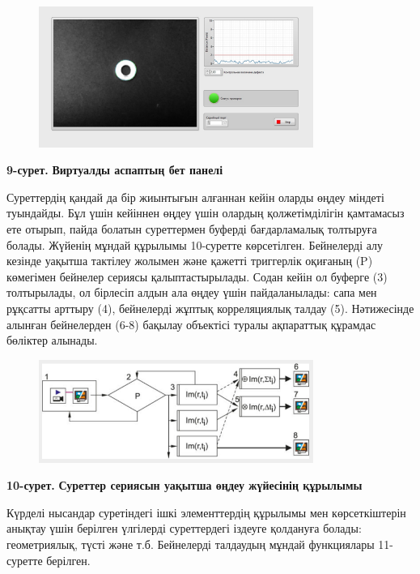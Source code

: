 \begin{figure}[H]
	\centering
	\includegraphics[width=0.8\textwidth]{media/ict2/image177}
	\caption*{}
\end{figure}


{\bfseries 9-сурет.} {\bfseries Виртуалды аспаптың бет панелі}

Суреттердің қандай да бір жиынтығын алғаннан кейін оларды өңдеу міндеті
туындайды. Бұл үшін кейіннен өңдеу үшін олардың қолжетімділігін
қамтамасыз ете отырып, пайда болатын суреттермен буферді бағдарламалық
толтыруға болады. Жүйенің мұндай құрылымы 10-суретте көрсетілген.
Бейнелерді алу кезінде уақытша тактілеу жолымен және қажетті триггерлік
оқиғаның (P) көмегімен бейнелер сериясы қалыптастырылады. Содан кейін ол
буферге (3) толтырылады, ол бірлесіп алдын ала өңдеу үшін пайдаланылады:
сапа мен рұқсатты арттыру (4), бейнелерді жұптық корреляциялық талдау
(5). Нәтижесінде алынған бейнелерден (6-8) бақылау объектісі туралы
ақпараттық құрамдас бөліктер алынады.


\begin{figure}[H]
	\centering
	\includegraphics[width=0.8\textwidth]{media/ict2/image178}
	\caption*{}
\end{figure}


{\bfseries 10-сурет.} {\bfseries Суреттер сериясын уақытша өңдеу жүйесінің
құрылымы}

Күрделі нысандар суретіндегі ішкі элементтердің құрылымы мен
көрсеткіштерін анықтау үшін берілген үлгілерді суреттердегі іздеуге
қолдануға болады: геометриялық, түсті және т.б. Бейнелерді талдаудың
мұндай функциялары 11-суретте берілген.


